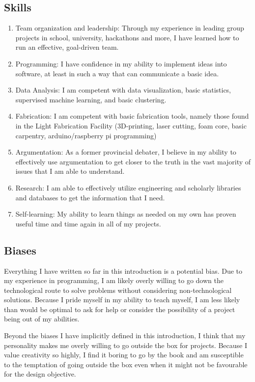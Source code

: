 \documentclass[a4paper,12pt]{article}
\begin{document}
\subsection{Skills}
\begin{enumerate}
\item Team organization and leadership: Through my experience in leading group projects in school, university, hackathons and more, I have learned how to run an effective, goal-driven team.
\item Programming: I have confidence in my ability to implement ideas into software, at least in such a way that can communicate a basic idea.
\item Data Analysis: I am competent with data visualization, basic statistics, supervised machine learning, and basic clustering.
\item Fabrication: I am competent with basic fabrication tools, namely those found in the Light Fabrication Facility (3D-printing, laser cutting, foam core, basic carpentry, arduino/raspberry pi programming)
\item Argumentation: As a former provincial debater, I believe in my ability to effectively use argumentation to get closer to the truth in the vast majority of issues that I am able to understand.
\item Research: I am able to effectively utilize engineering and scholarly libraries and databases to get the information that I need.
\item Self-learning: My ability to learn things as needed on my own has proven useful time and time again in all of my projects.
\end{enumerate}

\subsection{Biases}
Everything I have written so far in this introduction is a potential bias. Due to my experience in programming, I am likely overly willing to go down the technological route to solve problems without considering non-technological solutions. Because I pride myself in my ability to teach myself, I am less likely than would be optimal to ask for help or consider the possibility of a project being out of my abilities.

Beyond the biases I have implicitly defined in this introduction, I think that my personality makes me overly willing to go outside the box for projects. Because I value creativity so highly, I find it boring to go by the book and am susceptible to the temptation of going outside the box even when it might not be favourable for the design objective.
\end{document}
